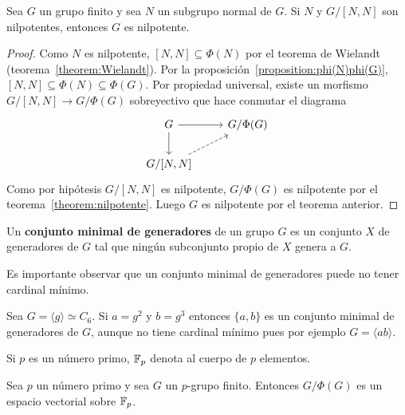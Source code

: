 \begin{theorem}[Hall]
	\label{theorem:Hall_nilpotente}
	Sea $G$ un grupo finito y sea $N$ un subgrupo normal de $G$. Si $N$ y
	$G/[N,N]$ son nilpotentes, entonces $G$ es nilpotente.
\end{theorem}

\begin{proof}
	Como $N$ es nilpotente, $[N,N]\subseteq\Phi(N)$ por el
	teorema de Wielandt (teorema~\ref{theorem:Wielandt}).	
	Por la proposición~\ref{proposition:phi(N)phi(G)},
	$[N,N]\subseteq\Phi(N)\subseteq\Phi(G)$. 
	Por propiedad universal, existe un morfismo
	$G/[N,N]\to G/\Phi(G)$ sobreyectivo que hace conmutar el diagrama
    \[
    \begin{tikzcd}
	G & {G/\Phi(G)} \\
	{G/[N,N]}
	\arrow[from=1-1, to=1-2]
	\arrow[from=1-1, to=2-1]
	\arrow[dashed, from=2-1, to=1-2]
    \end{tikzcd}
    \]
	Como por hipótesis $G/[N,N]$ es nilpotente, $G/\Phi(G)$ es nilpotente por
	el teorema~\ref{theorem:nilpotente}. Luego $G$ es nilpotente por el
	teorema anterior. %
\end{proof}

\begin{definition}
	Un \textbf{conjunto minimal de generadores} de un grupo $G$ es un conjunto
	$X$ de generadores de $G$ tal que ningún subconjunto propio de $X$ genera a
	$G$.
\end{definition}

Es importante observar que un conjunto minimal de generadores puede no
tener cardinal mínimo. 
	
\begin{example}
	Sea $G=\langle g\rangle\simeq C_6$.  Si $a=g^2$ y
	$b=g^3$ entonces $\{a,b\}$ es un conjunto minimal de generadores de $G$,
	aunque no tiene cardinal mínimo pues por ejemplo $G=\langle ab\rangle$.
\end{example}
	
Si $p$ es un número primo, $\mathbb{F}_p$ denota al cuerpo de $p$ elementos. 

\begin{lemma}
	\label{lemma:Burnside:minimal}
	Sea $p$ un número primo y sea 
	$G$ un $p$-grupo finito. Entonces $G/\Phi(G)$ es un espacio vectorial
	sobre $\mathbb{F}_p$.
\end{lemma}

